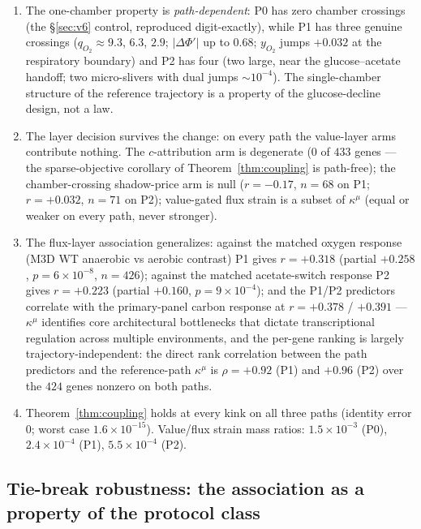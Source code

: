 \documentclass[11pt,a4paper]{article}
\theoremstyle{plain}
\theoremstyle{definition}
\theoremstyle{remark}
\newcommand{\kmu}{\kappa^{\mu}}
\begin{document}
\begin{enumerate}[label=(\roman*),leftmargin=2em]
\item The one-chamber property is \emph{path-dependent}: P0 has zero
      chamber crossings (the \S\ref{sec:v6} control, reproduced digit-exactly), while P1 has
      three genuine crossings ($q_{O_2} \approx 9.3$, $6.3$, $2.9$;
      $|\Delta\Phi'|$ up to $0.68$; $y_{O_2}$ jumps $+0.032$ at the
      respiratory boundary) and P2 has four (two large, near the
      glucose--acetate handoff; two micro-slivers with dual jumps
      $\sim 10^{-4}$). The single-chamber structure of the reference trajectory is a property of the glucose-decline design, not a law.
\item The layer decision survives the change: on every path the
      value-layer arms contribute nothing. The $c$-attribution arm is
      degenerate ($0$ of $433$ genes --- the sparse-objective
      corollary of Theorem~\ref{thm:coupling} is path-free); the
      chamber-crossing shadow-price arm is null ($r = -0.17$,
      $n = 68$ on P1; $r = +0.032$, $n = 71$ on P2); value-gated flux
      strain is a subset of $\kmu$ (equal or weaker on every path,
      never stronger).
\item The flux-layer association generalizes: against the matched
      oxygen response (M3D WT anaerobic vs aerobic contrast) P1 gives
      $r = +0.318$ (partial $+0.258$, $p = 6 \times 10^{-8}$,
      $n = 426$); against the matched acetate-switch response P2
      gives $r = +0.223$ (partial $+0.160$, $p = 9 \times
      10^{-4}$); and the P1/P2 predictors correlate with the
      primary-panel carbon response at $r = +0.378$ / $+0.391$ ---
      $\kmu$ identifies core architectural bottlenecks that dictate
      transcriptional regulation across multiple environments, and
      the per-gene
      ranking is largely trajectory-independent: the direct rank
      correlation between the path predictors and the
      reference-path $\kmu$ is $\rho = +0.92$ (P1) and $+0.96$
      (P2) over the $424$ genes nonzero on both paths.
\item Theorem~\ref{thm:coupling} holds at every kink on all three
      paths (identity error $0$; worst case $1.6 \times 10^{-15}$).
      Value/flux strain mass ratios: $1.5 \times 10^{-3}$ (P0),
      $2.4 \times 10^{-4}$ (P1), $5.5 \times 10^{-4}$ (P2).
\end{enumerate}

\subsection{Tie-break robustness: the association as a property
of the protocol class}\label{sec:v8}
\end{document}
